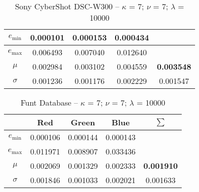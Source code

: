 \begin{appendix}
\begin{table}[htb]
\begin{tabular}{|c||c|c|c|c|}
      $e_\text{min}$ & 0.000101 & 0.000153 & 0.000434 &   \\\hline
      $e_\text{max}$ & 0.006493 & 0.007040 & 0.012640 &   \\\hline
      $\mu$          & 0.002984 & 0.003102 & 0.004559 & \textbf{0.003548} \\\hline
      $\sigma$       & 0.001236 & 0.001176 & 0.002229 & 0.001547 \\\hline
    \end{tabular}
  \caption{Sony CyberShot DSC-W300 -- $\kappa$ = 7; $\nu$ = 7; $\lambda$ = 10000}
  \label{tab:Sony CyberShot DSC-W3007710000}
\end{table}
\begin{table}[htb]
  \centering
    \begin{tabular}{|c||c|c|c|c|}\hline
		   & \textbf{Red} & \textbf{Green} & \textbf{Blue} & \textbf{$\sum$} \\\hline\hline
      $e_\text{min}$ & 0.000106 & 0.000144 & 0.000143 &   \\\hline
      $e_\text{max}$ & 0.011971 & 0.008907 & 0.033436 &   \\\hline
      $\mu$          & 0.002069 & 0.001329 & 0.002333 & \textbf{0.001910} \\\hline
      $\sigma$       & 0.001846 & 0.001033 & 0.002021 & 0.001633 \\\hline
    \end{tabular}
  \caption{Funt Database -- $\kappa$ = 7; $\nu$ = 7; $\lambda$ = 10000}
  \label{tab:Funt Database7710000}
\end{table}
\end{appendix}